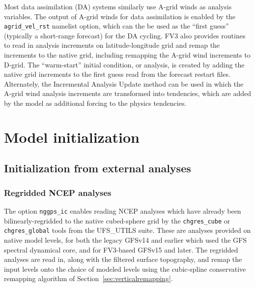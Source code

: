 \documentclass[10pt,letterpaper,margin=1in]{memoir}
\begin{document}
Most data assimilation (DA) systems similarly use A-grid winds as analysis variables. The output of A-grid winds for data assimilation is enabled by the \texttt{agrid_vel_rst} namelist option, which can the be used as the ``first guess'' (typically a short-range forecast) for the DA cycling. FV3 also provides routines to read in analysis increments on latitude-longitude grid and remap the increments to the native grid, including remapping the A-grid wind increments to D-grid. The ``warm-start'' initial condition, or analysis, is created by adding the native grid increments to the first guess read from the forecast restart files. Alternately, the Incremental Analysis Update \citep[IAU;][]{Bloom1996} method can be used in which the A-grid wind analysis increments are transformed into tendencies, which are added by the model as additional forcing to the physics tendencies.


\chapter{Model initialization}

\section{Initialization from external analyses}

\subsection{Regridded NCEP analyses} \label{subsec:ncepanalysis}

The option \texttt{nggps_ic} enables reading NCEP analyses which have already been bilinearly-regridded to the native cubed-sphere grid by the \texttt{chgres_cube} or \texttt{chgres_global} tools from the UFS_UTILS suite. These are analyses provided on native model levels, for both the legacy GFSv14 and earlier which used the GFS spectral dynamical core, and for FV3-based GFSv15 and later. The regridded analyses are read in, along with the filtered surface topography, and remap the input levels onto the choice of modeled levels using the cubic-spline conservative remapping algorithm of Section~\ref{sec:verticalremapping}. 
\end{document}
